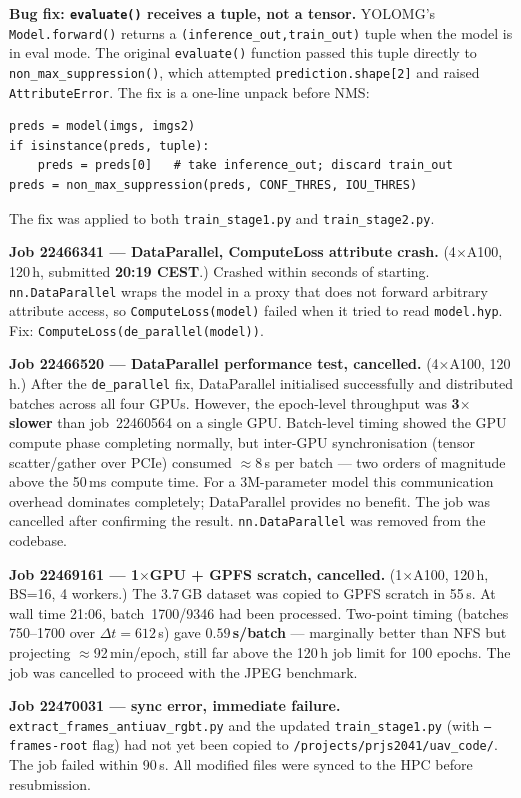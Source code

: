 \textbf{Bug fix: \texttt{evaluate()} receives a tuple, not a tensor.}
YOLOMG's \texttt{Model.forward()} returns a
\texttt{(inference\_out,\;train\_out)} tuple when the model is in eval
mode. The original \texttt{evaluate()} function passed this tuple
directly to \texttt{non\_max\_suppression()}, which attempted
\texttt{prediction.shape[2]} and raised \texttt{AttributeError}.
The fix is a one-line unpack before NMS:
\begin{verbatim}
preds = model(imgs, imgs2)
if isinstance(preds, tuple):
    preds = preds[0]   # take inference_out; discard train_out
preds = non_max_suppression(preds, CONF_THRES, IOU_THRES)
\end{verbatim}
The fix was applied to both \texttt{train\_stage1.py} and
\texttt{train\_stage2.py}.

\textbf{Job 22466341 — DataParallel, ComputeLoss attribute crash.}
(4$\times$A100, 120\,h, submitted \textbf{20:19 CEST}.) Crashed within
seconds of starting. \texttt{nn.DataParallel} wraps the model in a
proxy that does not forward arbitrary attribute access, so
\texttt{ComputeLoss(model)} failed when it tried to read
\texttt{model.hyp}. Fix: \texttt{ComputeLoss(de\_parallel(model))}.

\textbf{Job 22466520 — DataParallel performance test, cancelled.}
(4$\times$A100, 120\,h.) After the \texttt{de\_parallel} fix,
DataParallel initialised successfully and distributed batches across
all four GPUs. However, the epoch-level throughput was \textbf{3$\times$
slower} than job~22460564 on a single GPU. Batch-level timing showed
the GPU compute phase completing normally, but inter-GPU synchronisation
(tensor scatter/gather over PCIe) consumed $\approx$8\,s per batch —
two orders of magnitude above the 50\,ms compute time. For a 3M-parameter
model this communication overhead dominates completely; DataParallel
provides no benefit. The job was cancelled after confirming the result.
\texttt{nn.DataParallel} was removed from the codebase.

\textbf{Job 22469161 — 1$\times$GPU + GPFS scratch, cancelled.}
(1$\times$A100, 120\,h, BS=16, 4 workers.) The 3.7\,GB dataset was
copied to GPFS scratch in 55\,s. At wall time 21:06, batch~1700/9346
had been processed. Two-point timing (batches 750--1700 over
$\Delta t = 612$\,s) gave $\mathbf{0.59}$\,\textbf{s/batch} —
marginally better than NFS but projecting $\approx$92\,min/epoch,
still far above the 120\,h job limit for 100 epochs. The job was
cancelled to proceed with the JPEG benchmark.

\textbf{Job 22470031 — sync error, immediate failure.}
\texttt{extract\_frames\_antiuav\_rgbt.py} and the updated
\texttt{train\_stage1.py} (with \texttt{--frames-root} flag) had not
yet been copied to \texttt{/projects/prjs2041/uav\_code/}. The job
failed within 90\,s. All modified files were synced to the HPC
before resubmission.

